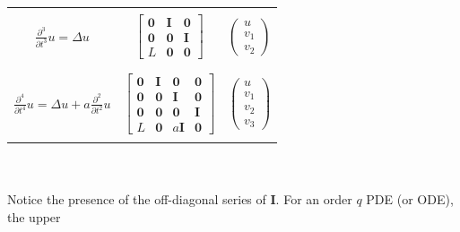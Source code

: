 {\begin{tabular}{c|c|c}
        \\\hline \hspace*{2mm} & \hspace*{2mm} 
        \\$\frac{\partial^3}{\partial t^3}u = \Delta u$ & 
        $\begin{bmatrix}
            \textbf{0} & \textbf{I} & \textbf{0}
            \\\textbf{0} & \textbf{0} & \textbf{I}
            \\ L & \textbf{0} & \textbf{0}
        \end{bmatrix}$ 
        & $\begin{pmatrix}
            u \\ v_1 \\ v_2
        \end{pmatrix}$
        \\ \hspace*{2mm} & \hspace*{2mm} 
        \\\hline \hspace*{2mm} & \hspace*{2mm} 
        \\$\frac{\partial^4}{\partial t^4}u = \Delta u + a\frac{\partial^2}{\partial t^2}u $ & 
        $\begin{bmatrix}
            \textbf{0} & \textbf{I} & \textbf{0} & \textbf{0}
            \\\textbf{0} & \textbf{0} & \textbf{I} & \textbf{0}
            \\ \textbf{0} & \textbf{0} & \textbf{0} & \textbf{I}
            \\ L & \textbf{0} & \!\!a\textbf{I} \!\!& \textbf{0}
        \end{bmatrix}$ \!
        & $\begin{pmatrix}
            u \\ v_1 \\ v_2 \\ v_3
        \end{pmatrix}$
        \\ \hspace*{2mm} & \hspace*{2mm} 
    \end{tabular}
    \\
    \\
    Notice the presence of the off-diagonal series of $\textbf{I}$. For an order $q$ PDE (or ODE), the upper 
}\noindent
